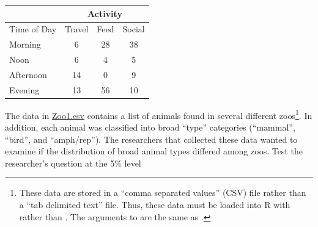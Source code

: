 \documentclass[10pt,openany]{book}\usepackage[]{graphicx}\usepackage[]{color}
\begin{document}
\begin{exsection}
  \begin{center}
    \begin{tabular}{|l|c|c|c|}
      \cline{2-4}
      \multicolumn{1}{l|}{} & \multicolumn{3}{c|}{Activity} \\
      \hline
      Time of Day & Travel & Feed & Social \\
      \hline
      Morning & 6 & 28 & 38 \\
      \hline
      Noon & 6 & 4 & 5 \\
      \hline
      Afternoon & 14 & 0 & 9 \\
      \hline
      Evening & 13 & 56 & 10 \\
      \hline
    \end{tabular}
  \end{center}

  \item \label{revex:chiZoo1} \rhw{} The data in \href{}{Zoo1.csv} contains a list of animals found in several different zoos\footnote{These data are stored in a ``comma separated values'' (CSV) file rather than a ``tab delimited text'' file.  Thus, these data must be loaded into R with  rather than .  The arguments to  are the same as .}.  In addition, each animal was classified into broad ``type'' categories (``mammal'', ``bird'', and ``amph/rep'').  The researchers that collected these data wanted to examine if the distribution of broad animal types differed among zoos.  Test the researcher's question at the 5\% level 

\end{exsection}
\end{document}
